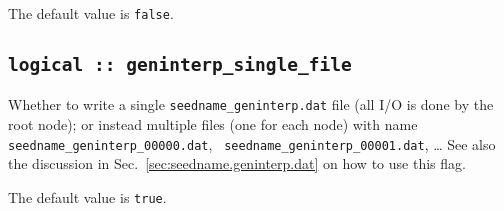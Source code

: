 The default value is \verb#false#.

\subsection[geninterp\_alsofirstder]{\tt logical :: geninterp\_single\_file}
Whether to write a single  {\tt seedname\_geninterp.dat} file (all I/O is done by the root node); or
instead multiple files (one for each node) with
name {\tt seedname\_geninterp\_00000.dat}, {\tt
  seedname\_geninterp\_00001.dat}, \ldots
See also the discussion in Sec.~\ref{sec:seedname.geninterp.dat} on
how to use this flag.

The default value is \verb#true#.

